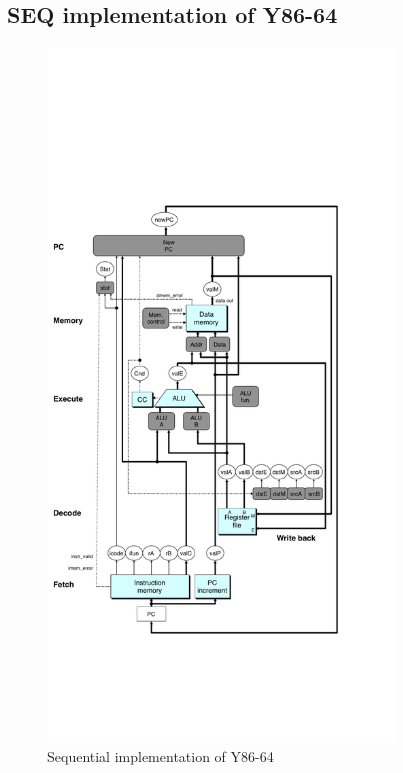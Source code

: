 \subsection{SEQ implementation of Y86-64}
\begin{figure}
\centering
\includegraphics[height=184mm]{seq.pdf}
\caption{Sequential implementation of Y86-64}
\end{figure}
